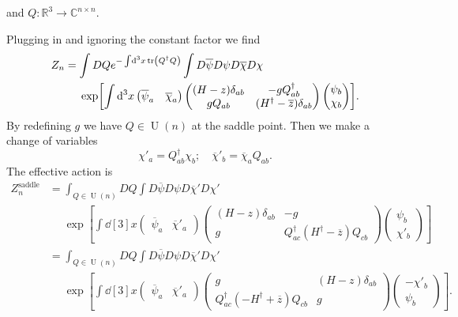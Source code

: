 \documentclass[letterpaper]{article}
\begin{document}
and $Q: \mathbb{R}^3 \rightarrow \mathbb{C}^{n\times n}$.
\par
Plugging in and ignoring the constant factor we find
\begin{align*}
    Z_n &= \int DQ e^{-\int \dd[3]{x} \tr(Q^\dagger Q)} \int D{\overline{\psi}}D{{\psi}}D{\overline{\chi}}D{{\chi}} \\
    &\phantom{{}={}} \exp[\int \dd[3]{x} \begin{pmatrix}
        \overline{\psi}_a & \overline{\chi}_a
    \end{pmatrix} \begin{pmatrix}
        (H - z)\delta_{ab} & -g Q^\dagger_{ab} \\
        g Q_{ab} & (H^\dagger - \overline{z})\delta_{ab}
    \end{pmatrix} \begin{pmatrix}
        \psi_b \\ \chi_b
    \end{pmatrix}].
\end{align*}
By redefining $g$ we have $Q\in \operatorname{U}(n)$ at the saddle point.
Then we make a change of variables
\[ \chi'_a = Q^\dagger_{ab} \chi_b;\quad \overline{\chi}'_b = \overline{\chi}_a Q_{ab}. \]
The effective action is
\begin{align*}
    Z_n^{\text{saddle}} &= \int_{Q\in \operatorname{U}(n)} DQ \int D{\overline{\psi}}D{{\psi}}D{\overline{\chi}'}D{{\chi}'} \\
    &\phantom{{}={}} \exp[\int \dd[3]{x} \begin{pmatrix}
        \overline{\psi}_a & \overline{\chi}'_a
    \end{pmatrix} \begin{pmatrix}
        (H - z)\delta_{ab} & -g \\
        g & Q^\dagger_{ac}(H^\dagger - \overline{z})Q_{cb}
    \end{pmatrix} \begin{pmatrix}
        \psi_b \\ \chi'_b
    \end{pmatrix}] \\
    &= \int_{Q\in \operatorname{U}(n)} DQ \int D{\overline{\psi}}D{{\psi}}D{\overline{\chi}'}D{{\chi}'} \\
    &\phantom{{}={}} \exp[\int \dd[3]{x} \begin{pmatrix}
        \overline{\psi}_a & \overline{\chi}'_a
    \end{pmatrix} \begin{pmatrix}
        g & (H - z)\delta_{ab} \\
        Q^\dagger_{ac}(- H^\dagger + \overline{z})Q_{cb} & g
    \end{pmatrix} \begin{pmatrix}
        -\chi'_b \\ \psi_b 
    \end{pmatrix}].
\end{align*}
\end{document}
